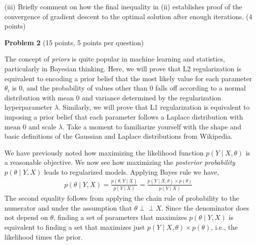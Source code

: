 \documentclass[letterpaper, 11pt]{article}
\newcommand{\problemAnswer}[1]{%
	\noindent\framebox[0.95\columnwidth][c]{\begin{minipage}{0.92\columnwidth}\color{blue}{#1}\end{minipage}} %
}
\def\ci{\perp\!\!\!\perp}
\begin{document}
\problemAnswer{

	\vspace*{150pt} %
}


(iii) Briefly comment on how the final inequality in (ii) establishes proof of the convergence of gradient descent to the optimal solution after enough iterations. (4 points)


\problemAnswer{

	\vspace*{150pt} %
}



\vspace{1em}

{\large\textbf{Problem 2}} (15 points, 5 points per question)

The concept of \emph{priors} is quite popular in machine learning and statistics, particularly in Bayesian thinking. Here, we will prove that L2 regularization is equivalent to encoding a prior belief that the most likely value for each parameter $\theta_i$ is 0, and the probability of values other than 0 falls off according to a normal distribution with mean 0 and variance determined by the regularization hyperparameter $\lambda$. Similarly, we will prove that L1 regularization is equivalent to imposing a prior belief that each parameter follows a Laplace distribution with mean 0 and scale  $\lambda$. Take a moment to familiarize yourself with the shape and basic definitions of the Gaussian and Laplace distributions from Wikipedia.

We have previously noted how maximizing the likelihood function $p(Y \mid X, \theta)$ is a reasonable objective. We now see how maximizing the \emph{posterior probability} $p(\theta \mid Y, X)$ leads to regularized models. Applying Bayes rule we have,
%
\begin{align*}
	p(\theta \mid Y, X) = \frac{p(\theta, Y \mid X)}{p(Y\mid X)} = \frac{p(Y \mid X, \theta)\times p(\theta)}{p(Y\mid X)}
\end{align*}
The second equality follows from applying the chain rule of probability to the numerator and under the assumption that $\theta \ci X$. Since the denominator does not depend on $\theta$, finding a set of parameters that maximizes $p(\theta\mid Y, X)$ is equivalent to finding a set that maximizes just $p(Y\mid X, \theta)\times p(\theta)$, i.e., the likelihood times the prior.
\end{document}
